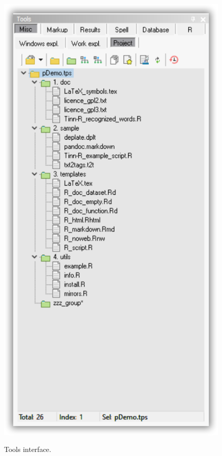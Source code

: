 \begin{figure}[H]
  \includegraphics[scale=0.35]{./res/tools_misc_project.png}\\
  \caption{Tools interface.}
  \label{fig:tools_misc_options}
\end{figure}

